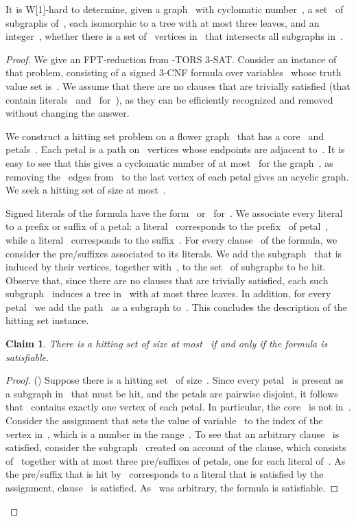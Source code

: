 \let\accentvec\vec  \documentclass{llncs}
\newtheorem{numberedclaim}{Claim}
\newcommand{\nTORSThreeSat}{\textsc{-TORS 3-SAT}\xspace}
\begin{document}
\begin{theorem} \label{theorem:hitclaws:whard}
It is W[1]-hard to determine, given a graph~ with cyclomatic number~, a set~ of subgraphs of~, each isomorphic to a tree with at most three leaves, and an integer~, whether there is a set of~ vertices in~ that intersects all subgraphs in~.
\end{theorem}
\begin{proof}
We give an FPT-reduction from \nTORSThreeSat. Consider an instance of that problem, consisting of a signed 3-CNF formula over variables~ whose truth value set is~. We assume that there are no clauses that are trivially satisfied (that contain literals~ and~ for~), as they can be efficiently recognized and removed without changing the answer.

We construct a hitting set problem on a flower graph~ that has a core~ and~ petals~. Each petal is a path on~ vertices whose endpoints are adjacent to~. It is easy to see that this gives a cyclomatic number of at most~ for the graph~, as removing the~ edges from~ to the last vertex of each petal gives an acyclic graph. We seek a hitting set of size at most~.

Signed literals of the formula have the form~ or~ for~. We associate every literal to a prefix or suffix of a petal: a literal~ corresponds to the prefix~ of petal~, while a literal~ corresponds to the suffix~. For every clause~ of the formula, we consider the pre/suffixes associated to its literals. We add the subgraph~ that is induced by their vertices, together with~, to the set~ of subgraphs to be hit. Observe that, since there are no clauses that are trivially satisfied, each such subgraph~ induces a tree in~ with at most three leaves. In addition, for every petal~ we add the path~ as a subgraph to~. This concludes the description of the hitting set instance.

\begin{numberedclaim} \label{claim:hitset:iff:sat}
There is a hitting set of size at most~ if and only if the formula is satisfiable.
\end{numberedclaim} 
\begin{proof}
() Suppose there is a hitting set~ of size~. Since every petal~ is present as a subgraph in~ that must be hit, and the petals are pairwise disjoint, it follows that~ contains exactly one vertex of each petal. In particular, the core~ is not in~. Consider the assignment that sets the value of variable~ to the index of the vertex in~, which is a number in the range~. To see that an arbitrary clause~ is satisfied, consider the subgraph~ created on account of the clause, which consists of~ together with at most three pre/suffixes of petals, one for each literal of~. As the pre/suffix that is hit by~ corresponds to a literal that is satisfied by the assignment, clause~ is satisfied. As~ was arbitrary, the formula is satisfiable.


\end{proof}
\end{proof}
\end{document}
